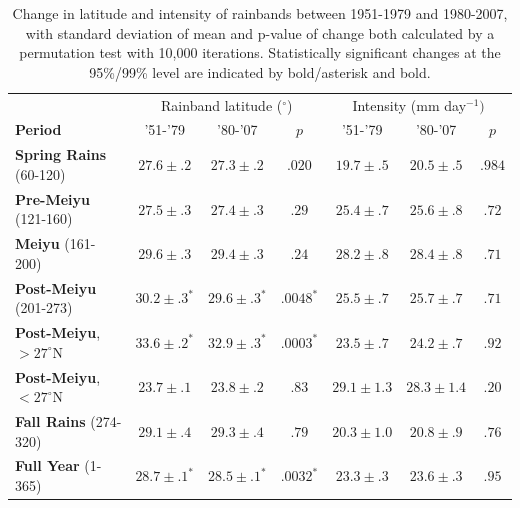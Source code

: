 \documentclass[final,grl]{agutexSI}
\begin{document}
\begin{table}

\centering

\caption{Change in latitude and intensity of rainbands between 1951-1979 and 1980-2007, with standard deviation of mean and p-value of change both calculated by a permutation test with 10,000 iterations. Statistically significant changes at the 95\%/99\% level are indicated by bold/asterisk and bold.}

\begin{tabular}{ l c c c c c c}
	& \multicolumn{3}{c}{Rainband latitude ($^\circ$)} & \multicolumn{3}{c}{Intensity (mm day$^{-1})$} \\
	\textbf{Period} & '51-'79 & '80-'07 & $p$ & '51-'79 & '80-'07 & $p$ \\
	\hline	
	\textbf{Spring Rains} (60-120)		& $\boldsymbol{27.6 \pm .2}$ & $\boldsymbol{27.3 \pm .2}$ & $ \boldsymbol{.020} $ 		& $\boldsymbol{19.7 \pm .5}$ 	& $\boldsymbol{20.5 \pm .5} $ & $\boldsymbol{.984}$ \\
	\textbf{Pre-Meiyu} (121-160) 		& $27.5 \pm .3$ & $27.4 \pm .3$ & $ .29 $ 		& $25.4 \pm .7$ 	& $25.6 \pm .8	$ & $.72$ \\
	\textbf{Meiyu} (161-200)			& $29.6 \pm .3$ & $29.4 \pm .3$ & $ .24 $ 		& $28.2 \pm .8$ 	& $28.4 \pm .8	$  & $.71$ \\
	\textbf{Post-Meiyu} (201-273)		& $\boldsymbol{30.2 \pm .3^*}$ & $\boldsymbol{29.6 \pm .3^*}$ & $\boldsymbol{.0048^*} $	& $25.5 \pm .7$ 	& $25.7 \pm .7	$ & $.71$ \\
	\textbf{Post-Meiyu}, $>27^\circ$N 	& $\boldsymbol{33.6 \pm .2^*}$ & $\boldsymbol{32.9 \pm .3^*}$ & $\boldsymbol{.0003^*} $ 	& $23.5 \pm .7$ 	& $24.2 \pm .7	$ & $.92$ \\
	\textbf{Post-Meiyu}, $<27^\circ$N 	& $23.7 \pm .1 $ & $23.8 \pm .2$ & $ .83 $ 	& $29.1 \pm 1.3$ 	& $28.3 \pm 1.4	$ & $.20$  \\
	\textbf{Fall Rains} (274-320)			& $29.1 \pm .4 $ & $29.3 \pm .4$ & $ .79 $ 	& $20.3 \pm 1.0$ 	& $20.8 \pm .9	$ & $.76$ \\
	\textbf{Full Year} (1-365)			& $\boldsymbol{28.7 \pm .1^*}$ & $\boldsymbol{28.5 \pm .1^*}$ & $\boldsymbol{.0032^*}$ 	& $23.3 \pm .3$ 	& $23.6 \pm .3	$ & $.95$ \\

\end{tabular}
\label{ts6}
\end{table}
\end{document}
